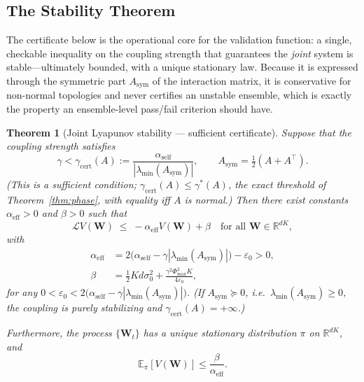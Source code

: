 \documentclass[12pt]{article}
\theoremstyle{plain}
\newtheorem{theorem}{Theorem}[section]
\theoremstyle{definition}
\newcommand{\R}{\mathbb{R}}
\newcommand{\E}{\mathbb{E}}
\newcommand{\Lgen}{\mathcal{L}}
\newcommand{\W}{\mathbf{W}}
\newcommand{\abs}[1]{\left| #1 \right|}
\begin{document}
\subsection{The Stability Theorem}

The certificate below is the operational core for the validation function: a single, checkable inequality on the coupling strength that guarantees the \emph{joint} system is stable---ultimately bounded, with a unique stationary law. Because it is expressed through the symmetric part $A_{\mathrm{sym}}$ of the interaction matrix, it is conservative for non-normal topologies and never certifies an unstable ensemble, which is exactly the property an ensemble-level pass/fail criterion should have.

\begin{theorem}[Joint Lyapunov stability --- sufficient certificate]
  \label{thm:stability}
  Suppose that the coupling strength satisfies
  \begin{equation}
    \gamma < \gamma_{\mathrm{cert}}(A) := \frac{\alpha_{\mathrm{self}}}
    {\abs{\lambda_{\min}(A_{\mathrm{sym}})}},
    \qquad A_{\mathrm{sym}}=\tfrac12(A+A^\top).
    \label{eq:gamma_star}
  \end{equation}
  (This is a \emph{sufficient} condition; $\gamma_{\mathrm{cert}}(A)\le\gamma^*(A)$,
  the exact threshold of Theorem~\ref{thm:phase}, with equality iff $A$ is
  normal.)  Then there exist constants $\alpha_{\mathrm{eff}} > 0$ and
  $\beta > 0$ such that
  \begin{equation}
    \Lgen V(\W) \;\leq\; -\alpha_{\mathrm{eff}} V(\W) + \beta
    \quad \text{for all } \W \in \R^{dK},
    \label{eq:foster_lyapunov}
  \end{equation}
  with
  \begin{align}
    \alpha_{\mathrm{eff}} &= 2\bigl(\alpha_{\mathrm{self}}
      - \gamma \abs{\lambda_{\min}(A_{\mathrm{sym}})}\bigr) - \varepsilon_0 > 0, \\
    \beta &= \frac{1}{2}Kd\sigma_0^2
      + \frac{\gamma^2 \Phi_{\max}^2 K}{4\varepsilon_0},
  \end{align}
  for any $0 < \varepsilon_0 <
  2\bigl(\alpha_{\mathrm{self}} - \gamma \abs{\lambda_{\min}(A_{\mathrm{sym}})}\bigr)$.
  (If $A_{\mathrm{sym}}\succeq 0$, i.e.\ $\lambda_{\min}(A_{\mathrm{sym}})\geq0$,
  the coupling is purely stabilizing and $\gamma_{\mathrm{cert}}(A)=+\infty$.)

  Furthermore, the process $\{\W_t\}$ has a unique stationary
  distribution $\pi$ on $\R^{dK}$, and
  \begin{equation}
    \E_\pi[V(\W)] \leq \frac{\beta}{\alpha_{\mathrm{eff}}}.
    \label{eq:stationary_bound}
  \end{equation}
\end{theorem}
\end{document}
